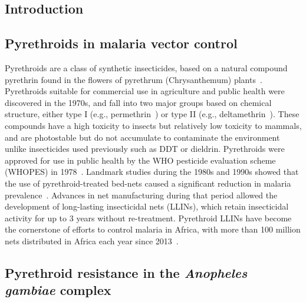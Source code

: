 \begin{refsection}
\section{Introduction}\label{sec:ch6-introduction}


\subsection{Pyrethroids in malaria vector control}\label{subsec:intro-pyrethroid-llins}


Pyrethroids are a class of synthetic insecticides, based on a natural compound pyrethrin found in the flowers of pyrethrum (Chrysanthemum) plants~\parencite{Elliott1989}.
%
Pyrethroids suitable for commercial use in agriculture and public health were discovered in the 1970s, and fall into two major groups based on chemical structure, either type I (e.g., permethrin~\parencite{Elliott1973}) or type II (e.g., deltamethrin~\parencite{Elliott1974}).
%
These compounds have a high toxicity to insects but relatively low toxicity to mammals, and are photostable but do not accumulate to contaminate the environment unlike insecticides used previously such as DDT or dieldrin.
%
Pyrethroids were approved for use in public health by the WHO pesticide evaluation scheme (WHOPES) in 1978~\parencite{Quelennec1988}.
%
Landmark studies during the 1980s and 1990s showed that the use of pyrethroid-treated bed-nets caused a significant reduction in malaria prevalence~\parencite{Carnevale2019}.
%
Advances in net manufacturing during that period allowed the development of long-lasting insecticidal nets (LLINs), which retain insecticidal activity for up to 3 years without re-treatment.
%
Pyrethroid LLINs have become the cornerstone of efforts to control malaria in Africa, with more than 100 million nets distributed in Africa each year since 2013~\parencite{Bhatt2015,AMP2020}.


\subsection{Pyrethroid resistance in the \textit{Anopheles gambiae} complex}\label{subsec:intro-pyrethroid-resistance}



\end{refsection}
